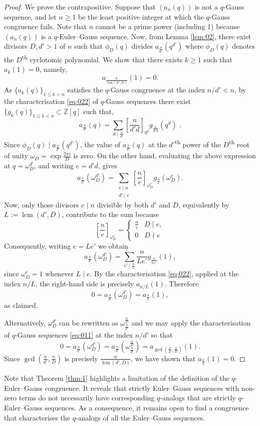 \documentclass{article}
\numberwithin{equation}{section}
\theoremstyle{definition}
\begin{document}
\begin{proof}
We prove the contrapositive. Suppose that $(a_n(q))$ is not a $q$-Gauss sequence, and let $n\geq1$ be the least positive integer at which the $q$-Gauss congruence fails. Note that $n$ cannot be a prime power (including $1$) because $(a_n(q))$ is a $q$-Euler--Gauss sequence. Now, from Lemma \ref{lem:02}, there exist divisors $D,d'>1$ of $n$ such that $\phi_D(q)$ divides $a_\frac{n}{d'}(q^{d'})$ where $\phi_D(q)$ denotes the $D$\textsuperscript{th} cyclotomic polynomial. We show that there exists $k\geq1$ such that $a_k(1)=0$, namely, 
\[a_\frac{n}{\operatorname{lcm}(d',D)}(1)=0.\] 
As $\{a_k(q)\}_{1\leq k<n}$ satisfies the $q$-Gauss congruence at the index $n/d'<n$, by the characterisation \eqref{eq:022} of $q$-Gauss sequences there exist $\{g_k(q)\}_{1\leq k< n}\subset\mathbb{Z}[q]$ such that, 
\[
    a_\frac{n}{d'}(q)=\sum_{d\mid\frac{n}{d'}}\left[\frac{n}{d'd}\right]_{q^{d}}g_\frac{n}{d'd}(q^{d})\text{ .}
\]
Since $\phi_D(q)\mid a_\frac{n}{d'}(q^{d'})$, the value of $a_\frac{n}{d'}(q)$ at the ${d'}$\textsuperscript{th} power of the $D$\textsuperscript{th} root of unity $\omega_D=\exp{\frac{2\pi i}{D}}$ is zero. On the other hand, evaluating the above expression at $q=\omega_D^{d'}$, and writing $e=d'd$, gives
\[
a_{\frac{n}{d'}}(\omega_D^{d'})
=
\sum_{\substack{e\mid n\\d'\mid e}}
\left[\frac{n}{e}\right]_{\omega_D^e}
g_{\frac{n}{e}}(\omega_D^e).
\]
Now, only those divisors $e\mid n$ divisible by both $d'$ and $D$, equivalently by $L:=\operatorname{lcm}(d',D)$, contribute to the sum because
\[\left[\frac{n}{e}\right]_{\omega_D^e}=
\begin{cases}
    \frac{n}{e}&D\mid e,\\
    0&D\nmid e
\end{cases}
\]
Consequently, writing $e=Le'$ we obtain
\[
a_{\frac{n}{d'}}(\omega_D^{d'})
=
\sum_{e'\mid\frac{n}{L}}
\frac{n}{Le'}g_{\frac{n}{Le'}}(1),
\]
since $\omega_D^e=1$ whenever $L\mid e$. By the characterisation \eqref{eq:022}, applied at the index $n/L$, the right-hand side is precisely $a_{n/L}(1)$. Therefore
\[
0=a_{\frac{n}{d'}}(\omega_D^{d'})=a_{\frac{n}{L}}(1),
\]
as claimed.


Alternatively, $\omega_D^{d'}$ can be rewritten as $\omega_\frac{n}{d'}^\frac{n}{D}$ and we may apply the characterisation of $q$-Gauss sequences \eqref{eq:011} at the index $n/d'$ so that 
\[0=a_\frac{n}{d'}(\omega_D^{d'})=a_\frac{n}{d'}(\omega_\frac{n}{d'}^\frac{n}{D})=a_{\gcd(\frac{n}{d'},\frac{n}{D})}(1).\]
Since $\gcd(\frac{n}{d'},\frac{n}{D})$ is precisely $\frac{n}{\operatorname{lcm}(d',D)}$, we have shown that $a_\frac{n}{L}(1)=0$.
\end{proof}
Note that Theorem \ref{thm:1} highlights a limitation of the definition of the $q$-Euler--Gauss congruence. It reveals that strictly Euler--Gauss sequences with non-zero terms do not necessarily have corresponding $q$-analogs that are strictly $q$-Euler--Gauss sequences. As a consequence, it remains open to find a congruence that characterises the $q$-analogs of all the Euler--Gauss sequences.
\end{document}
